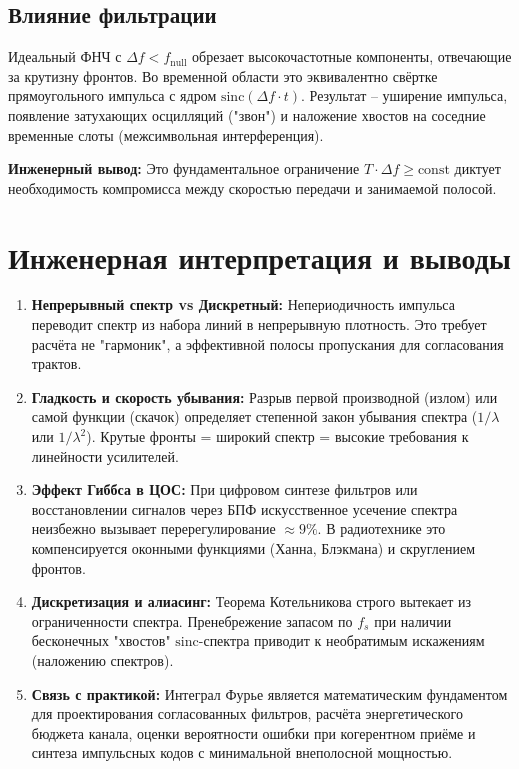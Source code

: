\documentclass[12pt,a4paper]{article}
\begin{document}
\subsection{Влияние фильтрации}
Идеальный ФНЧ с $\Delta f < f_{\text{null}}$ обрезает высокочастотные компоненты, отвечающие за крутизну фронтов. Во временной области это эквивалентно свёртке прямоугольного импульса с ядром $\text{sinc}(\Delta f \cdot t)$. Результат -- уширение импульса, появление затухающих осцилляций ("звон") и наложение хвостов на соседние временные слоты (межсимвольная интерференция). 

\begin{applink}
\textbf{Инженерный вывод:} Это фундаментальное ограничение $T \cdot \Delta f \ge \text{const}$ диктует необходимость компромисса между скоростью передачи и занимаемой полосой.
\end{applink}

\section{Инженерная интерпретация и выводы}
\begin{enumerate}
    \item \textbf{Непрерывный спектр vs Дискретный:} Непериодичность импульса переводит спектр из набора линий в непрерывную плотность. Это требует расчёта не "гармоник", а эффективной полосы пропускания для согласования трактов.
    \item \textbf{Гладкость и скорость убывания:} Разрыв первой производной (излом) или самой функции (скачок) определяет степенной закон убывания спектра ($1/\lambda$ или $1/\lambda^2$). Крутые фронты = широкий спектр = высокие требования к линейности усилителей.
    \item \textbf{Эффект Гиббса в ЦОС:} При цифровом синтезе фильтров или восстановлении сигналов через БПФ искусственное усечение спектра неизбежно вызывает перерегулирование $\approx 9\%$. В радиотехнике это компенсируется оконными функциями (Ханна, Блэкмана) и скруглением фронтов.
    \item \textbf{Дискретизация и алиасинг:} Теорема Котельникова строго вытекает из ограниченности спектра. Пренебрежение запасом по $f_s$ при наличии бесконечных "хвостов" $\text{sinc}$-спектра приводит к необратимым искажениям (наложению спектров).
    \item \textbf{Связь с практикой:} Интеграл Фурье является математическим фундаментом для проектирования согласованных фильтров, расчёта энергетического бюджета канала, оценки вероятности ошибки при когерентном приёме и синтеза импульсных кодов с минимальной внеполосной мощностью.
\end{enumerate}
\end{document}

